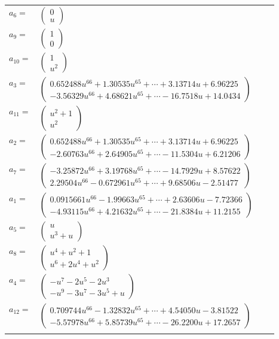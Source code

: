 \documentclass[1p]{elsarticle_modified}
\theoremstyle{definition}
\begin{document}
\begin{tabular}{m{7pt} m{180pt} m{7pt} m{180pt} }
\flushright $a_{6}=$&$\begin{pmatrix}0\\u\end{pmatrix}$ \\
\flushright $a_{9}=$&$\begin{pmatrix}1\\0\end{pmatrix}$ \\
\flushright $a_{10}=$&$\begin{pmatrix}1\\u^2\end{pmatrix}$ \\
\flushright $a_{3}=$&$\begin{pmatrix}0.652488 u^{66}+1.30535 u^{65}+\cdots+3.13714 u+6.96225\\-3.56329 u^{66}+4.68621 u^{65}+\cdots-16.7518 u+14.0434\end{pmatrix}$ \\
\flushright $a_{11}=$&$\begin{pmatrix}u^2+1\\u^2\end{pmatrix}$ \\
\flushright $a_{2}=$&$\begin{pmatrix}0.652488 u^{66}+1.30535 u^{65}+\cdots+3.13714 u+6.96225\\-2.60763 u^{66}+2.64905 u^{65}+\cdots-11.5304 u+6.21206\end{pmatrix}$ \\
\flushright $a_{7}=$&$\begin{pmatrix}-3.25872 u^{66}+3.19768 u^{65}+\cdots-14.7929 u+8.57622\\2.29504 u^{66}-0.672961 u^{65}+\cdots+9.68506 u-2.51477\end{pmatrix}$ \\
\flushright $a_{1}=$&$\begin{pmatrix}0.0915661 u^{66}-1.99663 u^{65}+\cdots+2.63606 u-7.72366\\-4.93115 u^{66}+4.21632 u^{65}+\cdots-21.8384 u+11.2155\end{pmatrix}$ \\
\flushright $a_{5}=$&$\begin{pmatrix}u\\u^3+u\end{pmatrix}$ \\
\flushright $a_{8}=$&$\begin{pmatrix}u^4+u^2+1\\u^6+2 u^4+u^2\end{pmatrix}$ \\
\flushright $a_{4}=$&$\begin{pmatrix}- u^7-2 u^5-2 u^3\\- u^9-3 u^7-3 u^5+u\end{pmatrix}$ \\
\flushright $a_{12}=$&$\begin{pmatrix}0.709744 u^{66}-1.32832 u^{65}+\cdots+4.54050 u-3.81522\\-5.57978 u^{66}+5.85739 u^{65}+\cdots-26.2200 u+17.2657\end{pmatrix}$\\&\end{tabular}
\end{document}
